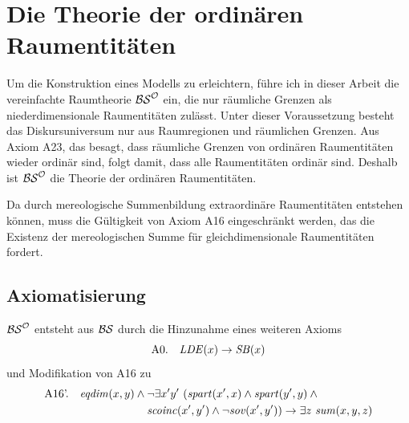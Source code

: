     
\section{Die Theorie der ordinären Raumentitäten}\label{sec:bso}
Um die Konstruktion eines Modells zu erleichtern, führe ich in dieser Arbeit die vereinfachte Raumtheorie $\mathcal{BS}^{\mathcal{O}}$ ein, die nur räumliche Grenzen als niederdimensionale Raumentitäten zulässt.
Unter dieser Voraussetzung besteht das Diskursuniversum nur aus Raumregionen und räumlichen Grenzen.
Aus Axiom A23, das besagt, dass räumliche Grenzen von ordinären Raumentitäten wieder ordinär sind, folgt damit, dass alle Raumentitäten ordinär sind.
Deshalb ist $\mathcal{BS}^{\mathcal{O}}$ die Theorie der ordinären Raumentitäten.

Da durch mereologische Summenbildung extraordinäre Raumentitäten entstehen können, muss die Gültigkeit von Axiom A16 eingeschränkt werden, das die Existenz der mereologischen Summe für gleichdimensionale Raumentitäten fordert.

\subsection{Axiomatisierung}
$\mathcal{BS}^{\mathcal{O}}$ entsteht aus $\mathcal{BS}$ durch die Hinzunahme eines weiteren Axioms
$$\text{A0.} \quad \mathit{LDE}(x) \to \mathit{S\hspace*{-0.25ex}B}(x)$$
und Modifikation von A16 zu
\begin{align*}
 \text{A16'.} \quad \Geqdim(x,y) \wedge \mbox{} &\neg \exists x'y'\ (\Gspart(x',x) \wedge \Gspart(y',y) \wedge \mbox{} \\
 &\Gscoinc(x',y') \wedge \neg \Gsov(x',y')) \to \exists z\ \Gsum(x,y,z)
\end{align*}

